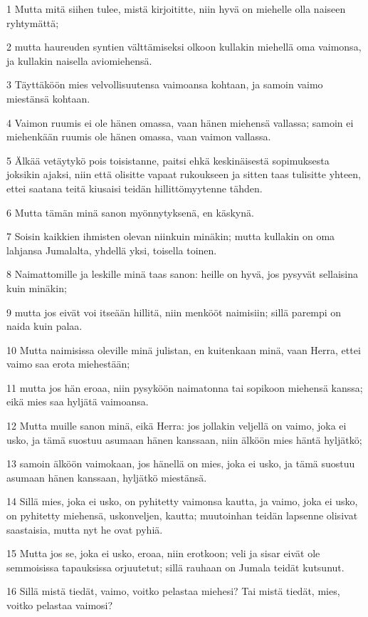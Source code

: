 \par 1 Mutta mitä siihen tulee, mistä kirjoititte, niin hyvä on miehelle olla naiseen ryhtymättä;
\par 2 mutta haureuden syntien välttämiseksi olkoon kullakin miehellä oma vaimonsa, ja kullakin naisella aviomiehensä.
\par 3 Täyttäköön mies velvollisuutensa vaimoansa kohtaan, ja samoin vaimo miestänsä kohtaan.
\par 4 Vaimon ruumis ei ole hänen omassa, vaan hänen miehensä vallassa; samoin ei miehenkään ruumis ole hänen omassa, vaan vaimon vallassa.
\par 5 Älkää vetäytykö pois toisistanne, paitsi ehkä keskinäisestä sopimuksesta joksikin ajaksi, niin että olisitte vapaat rukoukseen ja sitten taas tulisitte yhteen, ettei saatana teitä kiusaisi teidän hillittömyytenne tähden.
\par 6 Mutta tämän minä sanon myönnytyksenä, en käskynä.
\par 7 Soisin kaikkien ihmisten olevan niinkuin minäkin; mutta kullakin on oma lahjansa Jumalalta, yhdellä yksi, toisella toinen.
\par 8 Naimattomille ja leskille minä taas sanon: heille on hyvä, jos pysyvät sellaisina kuin minäkin;
\par 9 mutta jos eivät voi itseään hillitä, niin menkööt naimisiin; sillä parempi on naida kuin palaa.
\par 10 Mutta naimisissa oleville minä julistan, en kuitenkaan minä, vaan Herra, ettei vaimo saa erota miehestään;
\par 11 mutta jos hän eroaa, niin pysyköön naimatonna tai sopikoon miehensä kanssa; eikä mies saa hyljätä vaimoansa.
\par 12 Mutta muille sanon minä, eikä Herra: jos jollakin veljellä on vaimo, joka ei usko, ja tämä suostuu asumaan hänen kanssaan, niin älköön mies häntä hyljätkö;
\par 13 samoin älköön vaimokaan, jos hänellä on mies, joka ei usko, ja tämä suostuu asumaan hänen kanssaan, hyljätkö miestänsä.
\par 14 Sillä mies, joka ei usko, on pyhitetty vaimonsa kautta, ja vaimo, joka ei usko, on pyhitetty miehensä, uskonveljen, kautta; muutoinhan teidän lapsenne olisivat saastaisia, mutta nyt he ovat pyhiä.
\par 15 Mutta jos se, joka ei usko, eroaa, niin erotkoon; veli ja sisar eivät ole semmoisissa tapauksissa orjuutetut; sillä rauhaan on Jumala teidät kutsunut.
\par 16 Sillä mistä tiedät, vaimo, voitko pelastaa miehesi? Tai mistä tiedät, mies, voitko pelastaa vaimosi?
